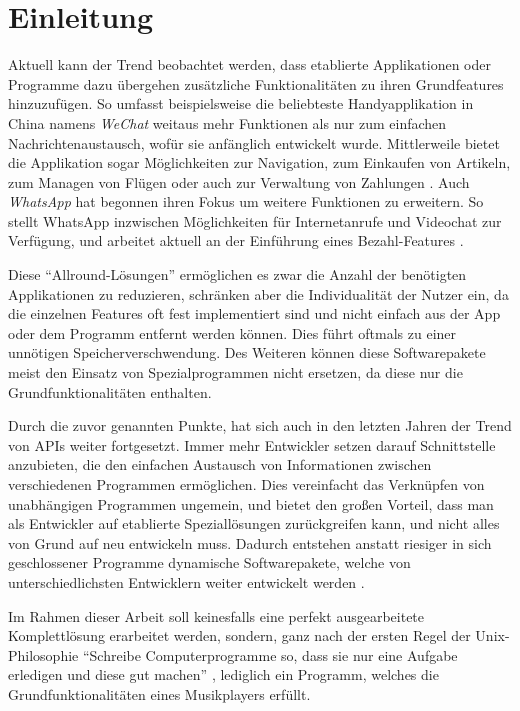 
\chapter{Einleitung}
Aktuell kann der Trend beobachtet werden, dass etablierte Applikationen oder
Programme dazu übergehen zusätzliche Funktionalitäten zu ihren Grundfeatures
hinzuzufügen. So umfasst beispielsweise die beliebteste Handyapplikation in China namens
\textit{WeChat} weitaus mehr Funktionen als nur zum einfachen
Nachrichtenaustausch, wofür sie anfänglich entwickelt wurde. Mittlerweile
bietet die Applikation sogar Möglichkeiten zur Navigation, zum
Einkaufen von Artikeln, zum Managen von Flügen oder auch zur Verwaltung von
Zahlungen \autocite{was_ist_wechat?_2019}. Auch \textit{WhatsApp} hat begonnen ihren
Fokus um weitere Funktionen zu erweitern. So stellt WhatsApp inzwischen
Möglichkeiten für Internetanrufe und Videochat zur Verfügung, und arbeitet
aktuell an der Einführung eines Bezahl-Features \autocite{shead_2019}. \hfill


Diese \enquote{Allround-Lösungen} ermöglichen es zwar die Anzahl der
benötigten Applikationen zu reduzieren, schränken aber die Individualität der
Nutzer ein, da die einzelnen Features oft fest implementiert sind und nicht
einfach aus der App oder dem Programm entfernt werden können. Dies führt
oftmals zu einer unnötigen Speicherverschwendung. Des Weiteren können diese
Softwarepakete meist den Einsatz von Spezialprogrammen nicht ersetzen, da diese
nur die Grundfunktionalitäten enthalten. \hfill


Durch die zuvor genannten Punkte, hat sich auch in den letzten Jahren der Trend
von \acp{API} weiter fortgesetzt. Immer mehr Entwickler setzen darauf
Schnittstelle anzubieten, die den einfachen Austausch von Informationen zwischen verschiedenen
Programmen ermöglichen. Dies vereinfacht das Verknüpfen von unabhängigen
Programmen ungemein, und bietet den großen Vorteil, dass man als Entwickler auf
etablierte Speziallösungen zurückgreifen kann, und nicht alles von Grund auf
neu entwickeln muss. Dadurch entstehen anstatt riesiger in sich geschlossener Programme
dynamische Softwarepakete, welche von unterschiedlichsten Entwicklern weiter
entwickelt werden \autocite{babati_2018} \autocite{sandoval_2018}. \hfill \break

Im Rahmen dieser Arbeit soll keinesfalls eine perfekt ausgearbeitete
Komplettlösung erarbeitet werden, sondern, ganz nach der ersten Regel der
Unix-Philosophie \enquote{Schreibe Computerprogramme so, dass sie nur eine
Aufgabe erledigen und diese gut machen} \autocite{gancarz_1997}, lediglich ein
Programm, welches die Grundfunktionalitäten eines Musikplayers erfüllt.


